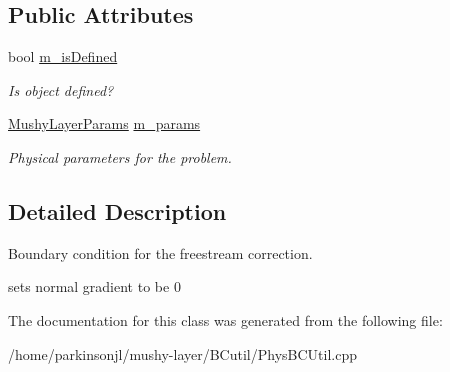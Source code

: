\subsection*{Public Attributes}
\begin{DoxyCompactItemize}
\item 
\mbox{\label{class_freestream_corr_b_c_function_ad6be36c1cc74d3b57f0e4e281facbb8b}} 
bool \hyperlink{class_freestream_corr_b_c_function_ad6be36c1cc74d3b57f0e4e281facbb8b}{m\+\_\+is\+Defined}
\begin{DoxyCompactList}\small\item\em Is object defined? \end{DoxyCompactList}\item 
\mbox{\label{class_freestream_corr_b_c_function_a263cee88a84aca937425bc75a14db918}} 
\hyperlink{class_mushy_layer_params}{Mushy\+Layer\+Params} \hyperlink{class_freestream_corr_b_c_function_a263cee88a84aca937425bc75a14db918}{m\+\_\+params}
\begin{DoxyCompactList}\small\item\em Physical parameters for the problem. \end{DoxyCompactList}\end{DoxyCompactItemize}


\subsection{Detailed Description}
Boundary condition for the freestream correction. 

sets normal gradient to be 0 

The documentation for this class was generated from the following file\+:\begin{DoxyCompactItemize}
\item 
/home/parkinsonjl/mushy-\/layer/\+B\+Cutil/Phys\+B\+C\+Util.\+cpp\end{DoxyCompactItemize}
